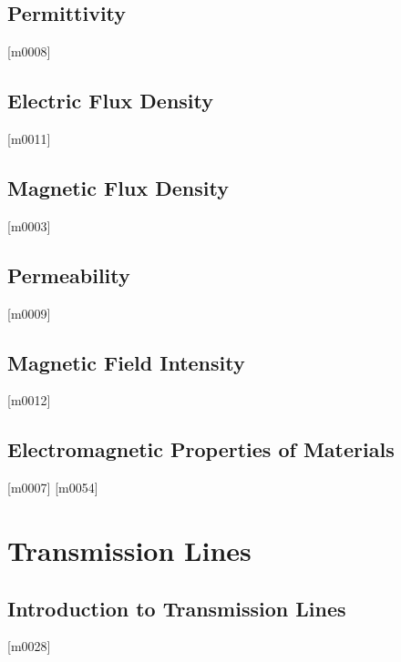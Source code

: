 \documentclass[10pt,letterpaper,twocolumn,openany]{book}
\theoremstyle{definition} %
\begin{document}
    \section{Permittivity}
{\color{blue}\tiny[m0008]}      
      \vfill\break
    \section{Electric Flux Density}
{\color{blue}\tiny[m0011]}      
      \vfill\break
    \section{Magnetic Flux Density}
{\color{blue}\tiny[m0003]}      
      \vfill\break
    \section{Permeability}
{\color{blue}\tiny[m0009]}      
      \vfill\break
    \section{Magnetic Field Intensity}
{\color{blue}\tiny[m0012]}      
      \vfill\break
    \section{Electromagnetic Properties of Materials}
{\color{blue}\tiny[m0007]}      
{\color{blue}\tiny[m0054]}    
  \chapter{Transmission Lines}
  \thispagestyle{fancy} %
  \fancyhf{}            %
    \section{Introduction to Transmission Lines}
{\color{blue}\tiny[m0028]}      
      \vfill\break
\end{document}
